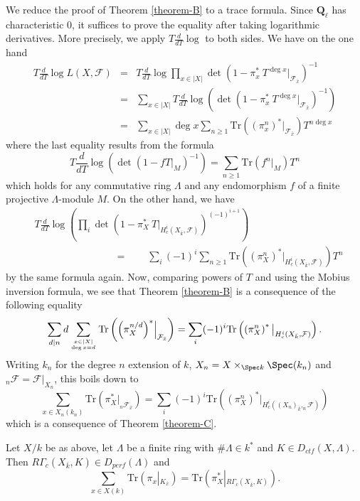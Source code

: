 \noindent
We reduce the proof of Theorem \ref{theorem-B} to a trace formula. Since
$\mathbf{Q}_\ell$ has characteristic 0, it suffices to prove the equality after
taking logarithmic derivatives. More precisely, we apply $T\frac{d}{dT} \log $
to both sides. We have on the one hand
\begin{eqnarray*}
T\frac{d}{dT}\log L(X, \mathcal{F}) & = &
T\frac{d}{dT} \log \prod_{x\in |X|} \det\left(1-\pi_x^*\ T^{\deg
x}\Big|_{\mathcal{F}_{\bar x}}\right)^{-1}\\
& = & \sum_{x\in |X|} T\frac{d}{dT} \log \left( \det\left(1-\pi_x^*\ T^{\deg
x}\Big|_{\mathcal{F}_{\bar x}}\right)^{-1}\right) \\
&= & \sum_{x \in |X|} \deg x\sum_{n \geq 1}
\text{Tr}\left({\left(\pi_x^n\right)}^*\big|_{\mathcal{F}_{\bar x}}\right)
T^{n\deg x}
\end{eqnarray*}
where the last equality results from the formula
$$
T\frac{d}{dT}\log\left(\det\left(1-fT|_M\right)^{-1}\right) = \sum_{n\geq 1}
\text{Tr}(f^n|_M)T^n
$$
which holds for any commutative ring $\Lambda$ and any endomorphism $f$ of a
finite projective $\Lambda$-module $M$. On the other hand, we have
\begin{align*}
&T\frac{d}{dT} \log\left(\prod_i \det\left(1-\pi_X^*\
T\Big|_{H_c^i\left(X_{\bar k} , \mathcal{F}\right)}\right)^{(-1)^{i+1}}\right)
\\
&\qquad\qquad\qquad \qquad = \qquad
\sum_i (-1)^i \sum_{n\geq 1}
\text{Tr}\left({\left(\pi_X^n\right)}^*\big|_{H_c^i(X_{\bar k},
\mathcal{F})}\right) T^n
\end{align*}
by the same formula again. Now, comparing powers of $T$ and using the Mobius
inversion formula, we see that Theorem \ref{theorem-B} is a consequence of the
following equality
$$
\sum_{d | n} d \sum_{x\in |X| \atop \deg x = d} \text{Tr} \left( {\left(
\pi_X^{n/d} \right)}^* \Big|_{\mathcal{F}_{\bar x}} \right)
=
\sum_i (-1)^i \text{Tr}\left(\left(\pi^n_X\right)^*\big|_{H^i_c(X_{\bar k},
\mathcal{F})} \right).
$$
Writing $k_n$ for the degree $n$ extension of $k$, $X_n = X \times_{\Spec
k} \Spec(k_n)$ and $_n \mathcal{F} = \mathcal{F}|_{X_n}$, this boils down
to
$$
\sum_{x \in X_n(k_n)} \text{Tr}\left( \pi_X^*\big|_{_n\mathcal{F}_{\bar x}}
\right)
=
\sum_i (-1)^i \text{Tr}\left(\left(\pi^n_X\right)^*\big|_{H^i_c({(X_n)}_{\bar
k}, _n\mathcal{F})} \right)
$$
which is a consequence of Theorem \ref{theorem-C}.



\begin{theorem}
\label{theorem-D}
Let $X/k$ be as above, let $\Lambda$ be a finite ring with $\#\Lambda \in k^*$
and $K\in D_{ctf}(X, \Lambda)$. Then $R\Gamma_c(X_{\bar k}, K)\in
D_{perf}(\Lambda)$ and
$$
\sum_{x\in X(k)}\text{Tr}\left(\pi_x\left|_{K_{\bar x}}\right.\right) =
\text{Tr}\left(\pi_X^*\left|_{R\Gamma_c(X_{\bar k}, K )}\right.\right).
$$
\end{theorem}

